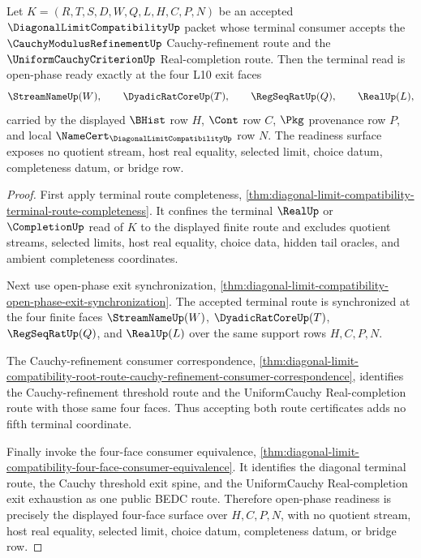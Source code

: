 \begin{theorem}
\label{thm:diagonal-limit-compatibility-open-phase-four-face-readiness}
Let $K=(R,T,S,D,W,Q,L,H,C,P,N)$ be an accepted $\DiagonalLimitCompatibilityUp$ packet whose terminal consumer accepts the $\CauchyModulusRefinementUp$ Cauchy-refinement route and the $\UniformCauchyCriterionUp$ Real-completion route. Then the terminal read is open-phase ready exactly at the four L10 exit faces
$$
\StreamNameUp(W),\qquad
\DyadicRatCoreUp(T),\qquad
\RegSeqRatUp(Q),\qquad
\RealUp(L),
$$
carried by the displayed $\BHist$ row $H$, $\Cont$ row $C$, $\Pkg$ provenance row $P$, and local $\NameCert_{\DiagonalLimitCompatibilityUp}$ row $N$. The readiness surface exposes no quotient stream, host real equality, selected limit, choice datum, completeness datum, or bridge row.
\end{theorem}
\begin{proof}
First apply terminal route completeness, \autoref{thm:diagonal-limit-compatibility-terminal-route-completeness}. It confines the terminal $\RealUp$ or $\CompletionUp$ read of $K$ to the displayed finite route and excludes quotient streams, selected limits, host real equality, choice data, hidden tail oracles, and ambient completeness coordinates.

Next use open-phase exit synchronization, \autoref{thm:diagonal-limit-compatibility-open-phase-exit-synchronization}. The accepted terminal route is synchronized at the four finite faces $\StreamNameUp(W)$, $\DyadicRatCoreUp(T)$, $\RegSeqRatUp(Q)$, and $\RealUp(L)$ over the same support rows $H,C,P,N$.

The Cauchy-refinement consumer correspondence, \autoref{thm:diagonal-limit-compatibility-root-route-cauchy-refinement-consumer-correspondence}, identifies the Cauchy-refinement threshold route and the UniformCauchy Real-completion route with those same four faces. Thus accepting both route certificates adds no fifth terminal coordinate.

Finally invoke the four-face consumer equivalence, \autoref{thm:diagonal-limit-compatibility-four-face-consumer-equivalence}. It identifies the diagonal terminal route, the Cauchy threshold exit spine, and the UniformCauchy Real-completion exit exhaustion as one public BEDC route. Therefore open-phase readiness is precisely the displayed four-face surface over $H,C,P,N$, with no quotient stream, host real equality, selected limit, choice datum, completeness datum, or bridge row.
\end{proof}

